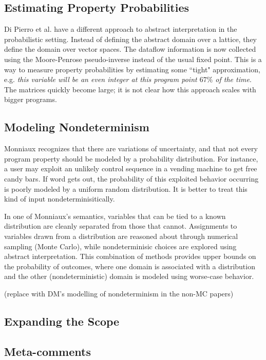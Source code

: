 \subsection{Estimating Property Probabilities}

Di Pierro et al. have a different approach to abstract 
interpretation in the probabilistic setting.
Instead of defining the abstract domain over a lattice, they
define the domain over vector spaces.
The dataflow information is now collected using the Moore-Penrose
pseudo-inverse instead of the usual fixed point.
This is a way to measure property probabilities by
estimating some ``tight" approximation, e.g.
{\sl this variable will be an even integer at this program point
$67\%$ of the time}.
The matrices quickly become large; it is not clear how this
approach scales with bigger programs.

\subsection{Modeling Nondeterminism}

Monniaux recognizes that there are variations of uncertainty,
and that not every program property should be modeled by a
probability distribution.
For instance, a user may exploit an unlikely control sequence
in a vending machine to get free candy bars. 
If word gets out, the probability of
this exploited behavior occurring is poorly modeled by a uniform 
random distribution.
It is better to treat this kind of input nondeterminisitically.

In one of Monniaux's semantics, variables that can be tied to a known
distribution are cleanly separated from those that cannot.
Assignments to variables drawn from a distribution are reasoned about
through numerical sampling (Monte Carlo), while nondeterminisic choices 
are explored using abstract interpretation.
This combination of methods provides upper bounds on the probability
of outcomes, where one domain is associated with a distribution 
and the other (nondeterministic) domain is modeled using worse-case 
behavior.

(replace with DM's modelling of nondeterminism in the non-MC papers)

\subsection{Expanding the Scope}

\subsection{Meta-comments}

